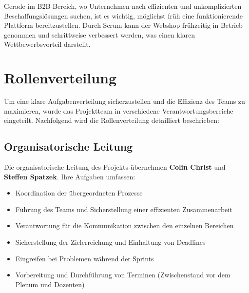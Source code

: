 \documentclass[%
	12pt,
	a4paper,
	oneside,
	parskip=full
]{scrbook}
\begin{document}
\begin{enumerate}
	Gerade im B2B-Bereich, wo Unternehmen nach effizienten und unkomplizierten Beschaffungslösungen suchen, ist es wichtig, möglichst früh eine funktionierende Plattform bereitzustellen. Durch Scrum kann der Webshop frühzeitig in Betrieb genommen und schrittweise verbessert werden, was einen klaren Wettbewerbsvorteil darstellt.
\end{enumerate}

\section{Rollenverteilung}

Um eine klare Aufgabenverteilung sicherzustellen und die Effizienz des Teams zu maximieren, wurde das Projektteam in verschiedene Verantwortungsbereiche eingeteilt. Nachfolgend wird die Rollenverteilung detailliert beschrieben:

\subsection{Organisatorische Leitung}
Die organisatorische Leitung des Projekts übernehmen \textbf{Colin Christ} und \textbf{Steffen Spatzek}. Ihre Aufgaben umfassen:
\begin{itemize}
	\item Koordination der übergeordneten Prozesse
	\item Führung des Teams und Sicherstellung einer effizienten Zusammenarbeit
	\item Verantwortung für die Kommunikation zwischen den einzelnen Bereichen
	\item Sicherstellung der Zielerreichung und Einhaltung von Deadlines
	\item Eingreifen bei Problemen während der Sprints
	\item Vorbereitung und Durchführung von Terminen (Zwischenstand vor dem Plenum und Dozenten)
	\end{itemize}
\end{document}
